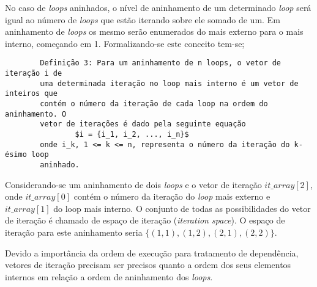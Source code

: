 No caso de \textit{loops} aninhados, o nível de aninhamento de um determinado 
\textit{loop} será igual ao número de \textit{loops} que estão iterando sobre
ele somado de um. Em aninhamento de \textit{loops} os mesmo serão enumerados do
mais externo para o mais interno, começando em 1. Formalizando-se este conceito
tem-se;

\begin{verbatim}
        Definição 3: Para um aninhamento de n loops, o vetor de iteração i de
        uma determinada iteração no loop mais interno é um vetor de inteiros que
        contém o número da iteração de cada loop na ordem do aninhamento. O
        vetor de iterações é dado pela seguinte equação
                $i = {i_1, i_2, ..., i_n}$
        onde i_k, 1 <= k <= n, representa o número da iteração do k-ésimo loop
        aninhado.
\end{verbatim}

Considerando-se um aninhamento de dois \textit{loops} e o vetor de iteração
$it\_array[2]$, onde $it\_array[0]$ contém o número da iteração do \textit{loop}
mais externo e $it\_array[1]$ do loop mais interno. 
O conjunto de todas as possibilidades do vetor de iteração é chamado de espaço 
de iteração (\textit{iteration space}). 
O espaço de iteração para este aninhamento seria $\{(1,1),(1,2),(2,1),(2,2)\}$.

Devido a importância da ordem de execução para tratamento de dependência,
vetores de iteração precisam ser precisos quanto a ordem dos seus elementos
internos em relação a ordem de aninhamento dos \textit{loops}. 










